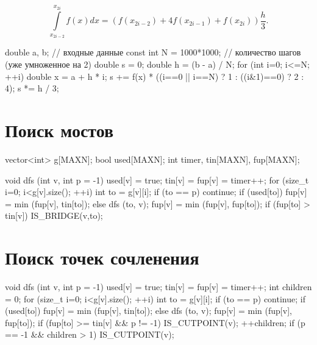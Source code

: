\documentclass[12pt, titlepage]{article}
\begin{document}
\begin{equation*}
\int\limits_{x_{2i-2}}^{x_{2i}} f(x) dx = \left( f(x_{2i-2})+4f(x_{2i-1}) + f(x_{2i})\right) \frac{h}{3}.
\end{equation*}

\begin{cppcode}
double a, b; // входные данные
const int N = 1000*1000; // количество шагов (уже умноженное на 2)
double s = 0;
double h = (b - a) / N;
for (int i=0; i<=N; ++i) {
    double x = a + h * i;
    s += f(x) * ((i==0 || i==N) ? 1 : ((i&1)==0) ? 2 : 4);
}
s *= h / 3;
\end{cppcode}

\section{Поиск мостов}
\begin{cppcode}
vector<int> g[MAXN];
bool used[MAXN];
int timer, tin[MAXN], fup[MAXN];

void dfs (int v, int p = -1) {
    used[v] = true;
    tin[v] = fup[v] = timer++;
    for (size_t i=0; i<g[v].size(); ++i) {
        int to = g[v][i];
        if (to == p)  continue;
        if (used[to])
            fup[v] = min (fup[v], tin[to]);
        else {
            dfs (to, v);
            fup[v] = min (fup[v], fup[to]);
            if (fup[to] > tin[v])
                IS_BRIDGE(v,to);
        }
    }
}
\end{cppcode}

\section{Поиск точек сочленения}
\begin{cppcode}
void dfs (int v, int p = -1) {
    used[v] = true;
    tin[v] = fup[v] = timer++;
    int children = 0;
    for (size_t i=0; i<g[v].size(); ++i) {
        int to = g[v][i];
        if (to == p)  continue;
        if (used[to])
            fup[v] = min (fup[v], tin[to]);
        else {
            dfs (to, v);
            fup[v] = min (fup[v], fup[to]);
            if (fup[to] >= tin[v] && p != -1)
                IS_CUTPOINT(v);
            ++children;
        }
    }
    if (p == -1 && children > 1)
        IS_CUTPOINT(v);
}
\end{cppcode}
\end{document}
